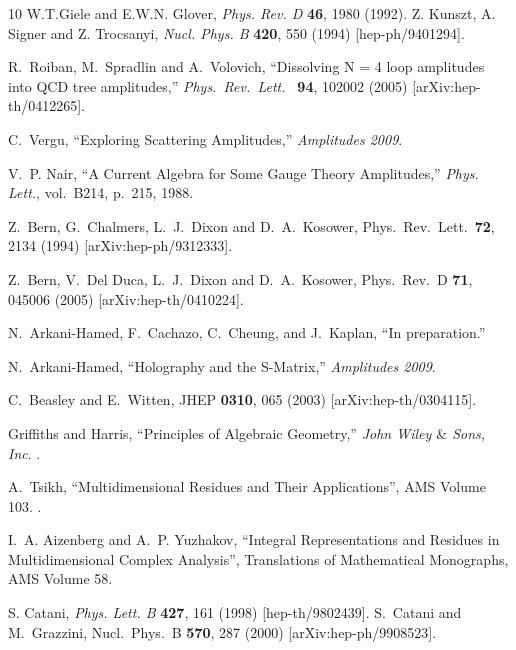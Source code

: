 \documentclass[12pt]{article}
\begin{document}
\begin{thebibliography}{10}
W.T.Giele and E.W.N. Glover, {\em Phys. Rev. D} {\bf 46}, 1980 (1992). Z. Kunszt, A. Signer and Z. Trocsanyi, {\em Nucl. Phys. B} {\bf 420}, 550 (1994) [hep-ph/9401294].

  R.~Roiban, M.~Spradlin and A.~Volovich,
  ``{Dissolving N = 4 loop amplitudes into QCD tree amplitudes},''
  {\em Phys.\ Rev.\ Lett.\ }  {\bf 94}, 102002 (2005)
  [arXiv:hep-th/0412265].

C.~Vergu, ``{Exploring Scattering Amplitudes},'' {\em Amplitudes 2009}.

V.~P. Nair, ``{A Current Algebra for Some Gauge Theory Amplitudes},'' {\em
  Phys. Lett.}, vol.~B214, p.~215, 1988.

 Z.~Bern, G.~Chalmers, L.~J.~Dixon and D.~A.~Kosower,
  Phys.\ Rev.\ Lett.\  {\bf 72}, 2134 (1994)
  [arXiv:hep-ph/9312333].

 Z.~Bern, V.~Del Duca, L.~J.~Dixon and D.~A.~Kosower,
  Phys.\ Rev.\  D {\bf 71}, 045006 (2005)
  [arXiv:hep-th/0410224].

N.~Arkani-Hamed, F.~Cachazo, C.~Cheung, and J.~Kaplan, ``{In preparation}.''

N.~Arkani-Hamed, ``{Holography and the S-Matrix},'' {\em Amplitudes 2009}.

 C.~Beasley and E.~Witten,
  JHEP {\bf 0310}, 065 (2003)
  [arXiv:hep-th/0304115].

Griffiths and Harris, ``{Principles of Algebraic Geometry},'' {\em John Wiley $\&$ Sons, Inc}.
.

A.~Tsikh, ``{Multidimensional Residues and Their Applications}'', AMS Volume 103.
.

I.~A. Aizenberg and A.~P. Yuzhakov, ``{Integral Representations and Residues in Multidimensional Complex Analysis}'',
Translations of Mathematical Monographs, AMS Volume 58.

S. Catani, {\em Phys. Lett. B} {\bf 427}, 161 (1998) [hep-th/9802439].
 S.~Catani and M.~Grazzini,
  Nucl.\ Phys.\  B {\bf 570}, 287 (2000)
  [arXiv:hep-ph/9908523].


\end{thebibliography}
\end{document}
